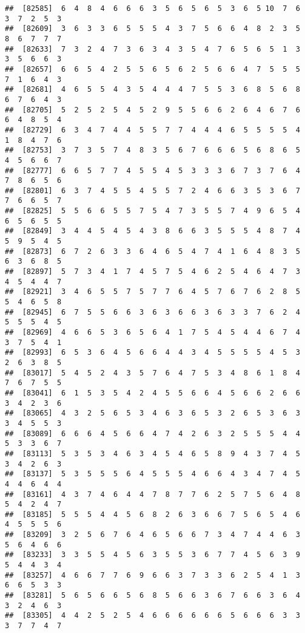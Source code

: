 \documentclass[
]{book}
\begin{document}
\begin{verbatim}
##  [82585]  6  4  8  4  6  6  6  3  5  6  5  6  5  3  6  5 10  7  6  3  7  2  5  3
##  [82609]  3  6  3  3  6  5  5  5  4  3  7  5  6  6  4  8  2  3  5  8  6  7  7  7
##  [82633]  7  3  2  4  7  3  6  3  4  3  5  4  7  6  5  6  5  1  3  3  5  6  6  3
##  [82657]  6  6  5  4  2  5  5  6  5  6  2  5  6  6  4  7  5  5  5  7  1  6  4  3
##  [82681]  4  6  5  5  4  3  5  4  4  4  7  5  5  3  6  8  5  6  8  6  7  6  4  3
##  [82705]  5  2  5  2  5  4  5  2  9  5  5  6  6  2  6  4  6  7  6  6  4  8  5  4
##  [82729]  6  3  4  7  4  4  5  5  7  7  4  4  4  6  5  5  5  5  4  1  8  4  7  6
##  [82753]  3  7  3  5  7  4  8  3  5  6  7  6  6  6  5  6  8  6  5  4  5  6  6  7
##  [82777]  6  6  5  7  7  4  5  5  4  5  3  3  3  6  7  3  7  6  4  7  8  6  5  6
##  [82801]  6  3  7  4  5  5  4  5  5  7  2  4  6  6  3  5  3  6  7  7  6  6  5  7
##  [82825]  5  5  6  6  5  5  7  5  4  7  3  5  5  7  4  9  6  5  4  6  5  6  5  5
##  [82849]  3  4  4  5  4  5  4  3  8  6  6  3  5  5  5  4  8  7  4  5  9  5  4  5
##  [82873]  6  7  2  6  3  3  6  4  6  5  4  7  4  1  6  4  8  3  5  6  3  6  8  5
##  [82897]  5  7  3  4  1  7  4  5  7  5  4  6  2  5  4  6  4  7  3  4  5  4  4  7
##  [82921]  3  4  6  5  5  7  5  7  7  6  4  5  7  6  7  6  2  8  5  5  4  6  5  8
##  [82945]  6  7  5  5  6  6  3  6  3  6  6  3  6  3  3  7  6  2  4  5  5  5  4  5
##  [82969]  4  6  6  5  3  6  5  6  4  1  7  5  4  5  4  4  6  7  4  3  7  5  4  1
##  [82993]  6  5  3  6  4  5  6  6  4  4  3  4  5  5  5  5  4  5  3  2  6  3  8  5
##  [83017]  5  4  5  2  4  3  5  7  6  4  7  5  3  4  8  6  1  8  4  7  6  7  5  5
##  [83041]  6  1  5  3  5  4  2  4  5  5  6  6  4  5  6  6  2  6  6  3  4  2  3  6
##  [83065]  4  3  2  5  6  5  3  4  6  3  6  5  3  2  6  5  3  6  3  3  4  5  5  3
##  [83089]  6  6  6  4  5  6  6  4  7  4  2  6  3  2  5  5  5  4  4  5  3  3  6  7
##  [83113]  5  3  5  3  4  6  3  4  5  4  6  5  8  9  4  3  7  4  5  3  4  2  6  3
##  [83137]  5  3  5  5  5  6  4  5  5  5  4  6  6  4  3  4  7  4  5  4  4  6  4  4
##  [83161]  4  3  7  4  6  4  4  7  8  7  7  6  2  5  7  5  6  4  8  5  4  2  4  7
##  [83185]  5  5  5  4  4  5  6  8  2  6  3  6  6  7  5  6  5  4  6  4  5  5  5  6
##  [83209]  3  2  5  6  7  6  4  6  5  6  6  7  3  4  7  4  4  6  3  5  6  4  6  6
##  [83233]  3  3  5  5  4  5  6  3  5  5  3  6  7  7  4  5  6  3  9  5  4  4  3  4
##  [83257]  4  6  6  7  7  6  9  6  6  3  7  3  3  6  2  5  4  1  3  6  6  5  3  3
##  [83281]  5  6  5  6  6  5  6  8  5  6  6  3  6  7  6  6  3  6  4  3  2  4  6  3
##  [83305]  4  4  2  5  2  5  4  6  6  6  6  6  6  5  6  6  6  3  3  3  7  7  4  7

\end{verbatim}
\end{document}
